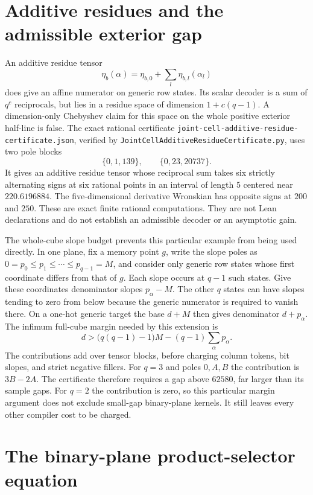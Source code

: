 \documentclass[11pt]{article}
\begin{document}
\section{Additive residues and the admissible exterior gap}

An additive residue tensor
\[
 \eta_b(\alpha)=\eta_{b,0}+\sum_l\eta_{b,l}(\alpha_l)
\]
does give an affine numerator on generic row states. Its scalar decoder
is a sum of $q^c$ reciprocals, but lies in a residue space of dimension
$1+c(q-1)$. A dimension-only Chebyshev claim for this space on the whole
positive exterior half-line is false. The exact rational certificate
\texttt{joint-cell-additive-residue-certificate.json}, verified by
\texttt{JointCellAdditiveResidueCertificate.py}, uses two pole blocks
\[
 \{0,1,139\},\qquad\{0,23,20737\}.
\]
It gives an additive residue tensor whose reciprocal sum takes six
strictly alternating signs at six rational points in an interval of
length $5$ centered near $220.6196884$. The five-dimensional derivative
Wronskian has opposite signs at $200$ and $250$. These are exact finite
rational computations. They are not Lean declarations and do not
establish an admissible decoder or an asymptotic gain.

The whole-cube slope budget prevents this particular example from being
used directly. In one plane, fix a memory point $g$, write the slope
poles as $0=p_0\leq p_1\leq\cdots\leq p_{q-1}=M$, and consider only
generic row states whose first coordinate differs from that of $g$.
Each slope occurs at $q-1$ such states. Give these coordinates denominator
slopes $p_\alpha-M$. The other $q$ states can have slopes tending to zero
from below because the generic numerator is required to vanish there.
On a one-hot generic target the base $d+M$ then gives denominator
$d+p_\alpha$. The infimum full-cube margin needed by this extension is
\[
 d>\bigl(q(q-1)-1\bigr)M-(q-1)\sum_\alpha p_\alpha.
\]
The contributions add over tensor blocks, before charging column tokens,
bit slopes, and strict negative fillers. For $q=3$ and poles $0,A,B$ the
contribution is $3B-2A$. The certificate therefore requires a gap above
$62580$, far larger than its sample gaps. For $q=2$ the contribution is
zero, so this particular margin argument does not exclude small-gap
binary-plane kernels. It still leaves every other compiler cost to be
charged.

\section{The binary-plane product-selector equation}
\end{document}
